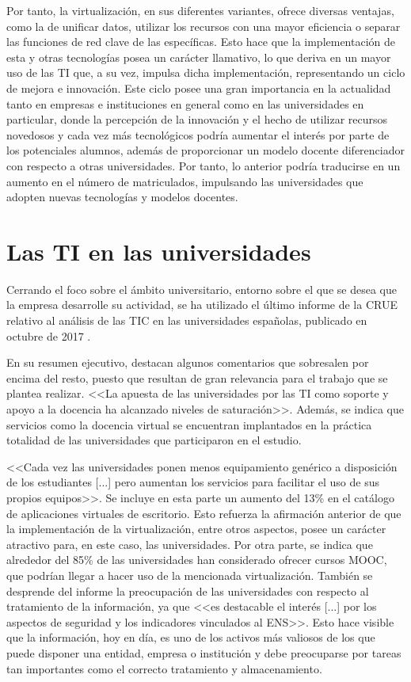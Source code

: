 Por tanto, la virtualización, en sus diferentes variantes, ofrece diversas ventajas, como la de unificar datos, utilizar los recursos con una mayor eficiencia o separar las funciones de red clave de las específicas. Esto hace que la implementación de esta y otras tecnologías posea un carácter llamativo, lo que deriva en un mayor uso de las \acf{TI} que, a su vez, impulsa dicha implementación, representando un ciclo de mejora e innovación. Este ciclo posee una gran importancia en la actualidad tanto en empresas e instituciones en general como en las universidades en particular, donde la percepción de la innovación y el hecho de utilizar recursos novedosos y cada vez más tecnológicos podría aumentar el interés por parte de los potenciales alumnos, además de proporcionar un modelo docente diferenciador con respecto a otras universidades. Por tanto, lo anterior podría traducirse en un aumento en el número de matriculados, impulsando las universidades que adopten nuevas tecnologías y modelos docentes.

\section{Las \acs{TI} en las universidades}
Cerrando el foco sobre el ámbito universitario, entorno sobre el que se desea que la empresa desarrolle su actividad, se ha utilizado el último informe de la \acf{CRUE} relativo al análisis de las \acf{TIC} en las universidades españolas, publicado en octubre de 2017 \cite{universitic2017}.

En su resumen ejecutivo, destacan algunos comentarios que sobresalen por encima del resto, puesto que resultan de gran relevancia para el trabajo que se plantea realizar. <<La apuesta de las universidades por las \acs{TI} como soporte y apoyo a la docencia ha alcanzado niveles de saturación>>. Además, se indica que servicios como la docencia virtual se encuentran implantados en la práctica totalidad de las universidades que participaron en el estudio.

\clearpage

<<Cada vez las universidades ponen menos equipamiento genérico a disposición de los estudiantes [...] pero aumentan los servicios para facilitar el uso de sus propios equipos>>. Se incluye en esta parte un aumento del 13\% en el catálogo de aplicaciones virtuales de escritorio. Esto refuerza la afirmación anterior de que la implementación de la virtualización, entre otros aspectos, posee un carácter atractivo para, en este caso, las universidades. Por otra parte, se indica que alrededor del 85\% de las universidades han considerado ofrecer cursos \acf{MOOC}, que podrían llegar a hacer uso de la mencionada virtualización. También se desprende del informe la preocupación de las universidades con respecto al tratamiento de la información, ya que <<es destacable el interés [...] por los aspectos de seguridad y los indicadores vinculados al \acf{ENS}>>. Esto hace visible que la información, hoy en día, es uno de los activos más valiosos de los que puede disponer una entidad, empresa o institución y debe preocuparse por tareas tan importantes como el correcto tratamiento y almacenamiento.

